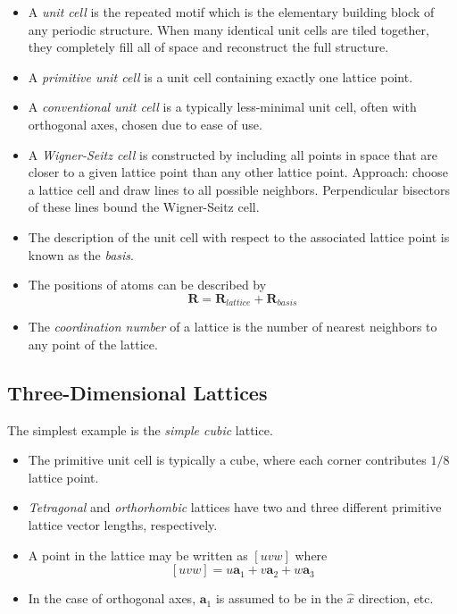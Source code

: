 \documentclass[10pt]{article}
\begin{document}
\begin{itemize}
  \item A \emph{unit cell} is the repeated motif which is the elementary building block of
  any periodic structure. When many identical unit cells are tiled together, they
  completely fill all of space and reconstruct the full structure.
  \item A \emph{primitive unit cell} is a unit cell containing exactly one lattice point.
  \item A \emph{conventional unit cell} is a typically less-minimal unit cell, often
  with orthogonal axes, chosen due to ease of use.
  \item A \emph{Wigner-Seitz cell} is constructed by including all points in space that are
  closer to a given lattice point than any other lattice point. Approach: choose a lattice cell
  and draw lines to all possible neighbors. Perpendicular bisectors of these lines bound the
  Wigner-Seitz cell.
  \item The description of the unit cell with respect to the associated lattice point is
  known as the \emph{basis}.
  \item The positions of atoms can be described by
  $$ \textbf{R} = \textbf{R}_{lattice} + \textbf{R}_{basis} $$
  \item The \emph{coordination number} of a lattice is the number of nearest neighbors to any point of the lattice.
\end{itemize}

\subsection{Three-Dimensional Lattices}
The simplest example is the \emph{simple cubic} lattice.
\begin{itemize}
  \item The primitive unit cell is typically a cube, where each corner contributes $1/8$ lattice point.
  \item \emph{Tetragonal} and \emph{orthorhombic} lattices have two and three different primitive lattice
  vector lengths, respectively.
  \item A point in the lattice may be written as $[uvw]$ where
  $$[uvw] =  u\textbf{a}_{1} + v\textbf{a}_2 + w\textbf{a}_{3}$$
  \item In the case of orthogonal axes, $\textbf{a}_{1}$ is assumed to be in the $\hat{x}$ direction, etc.
\end{itemize}
\end{document}
